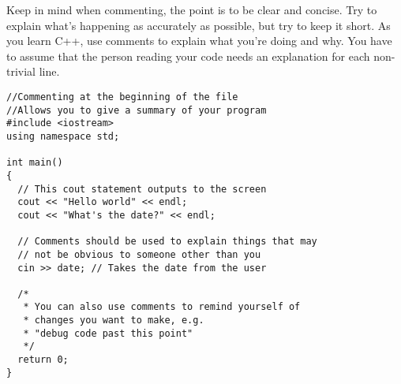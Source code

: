 Keep in mind when commenting, the point is to be clear and concise. 
Try to explain what's happening as accurately as possible, but try to keep it short. 
As you learn C++, use comments to explain what you're doing and why. 
You have to assume that the person reading your code needs an explanation for each non-trivial line. 

\noindent\begin{minipage}{\linewidth}\begin{lstlisting}
//Commenting at the beginning of the file
//Allows you to give a summary of your program
#include <iostream>
using namespace std;

int main()
{
  // This cout statement outputs to the screen
  cout << "Hello world" << endl; 	
  cout << "What's the date?" << endl;

  // Comments should be used to explain things that may 
  // not be obvious to someone other than you
  cin >> date; // Takes the date from the user
 
  /* 
   * You can also use comments to remind yourself of 
   * changes you want to make, e.g. 
   * "debug code past this point" 
   */
  return 0;
}
\end{lstlisting}\end{minipage}


